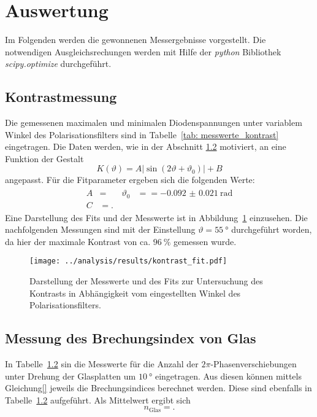 \section{Auswertung}
Im Folgenden werden die gewonnenen Messergebnisse vorgestellt. Die notwendigen Ausgleichsrechungen werden 
mit Hilfe der \emph{python} Bibliothek \emph{scipy.optimize} durchgeführt.

\subsection{Kontrastmessung}
Die gemessenen maximalen und minimalen Diodenspannungen unter variablem Winkel des Polarisationsfilters sind in 
Tabelle~\ref{tab: messwerte_kontrast} eingetragen.
Die Daten werden, wie in der Abschnitt \ref{} motiviert, an eine Funktion der Gestalt
\begin{equation}
    K(\vartheta) = A \left|\sin \left(2 \vartheta + \vartheta_0 \right)\right| + B 
\end{equation}
angepasst. Für die Fitparameter ergeben sich die folgenden Werte:
\begin{align}
    \begin{aligned}
    A &=  \quad  & \vartheta_0 &=  = \SI{-0.092(21)}{\radian} \\ 
    C &= .
    \end{aligned}
\end{align}
Eine Darstellung des Fits und der Messwerte ist in Abbildung~\ref{fig: kontrast_fit} einzusehen.
Die nachfolgenden Messungen sind mit der Einstellung $\vartheta = \SI{55}{\degree}$ durchgeführt worden, da hier der maximale 
Kontrast von ca. $\SI{96}{\percent}$ gemessen wurde.  



\begin{figure}[h]
    \centering
    \texttt{[image: ../analysis/results/kontrast\_fit.pdf]}
    \label{fig: kontrast_fit}
    \caption{Darstellung der Messwerte und des Fits zur Untersuchung des Kontrasts in Abhängigkeit vom eingestellten Winkel des Polarisationsfilters.}
\end{figure}


\subsection{Messung des Brechungsindex von Glas}
In Tabelle~\ref{} sin die Messwerte für die Anzahl der $2\pi$-Phasenverschiebungen unter Drehung der Glasplatten um $\SI{10}{\degree}$
eingetragen. Aus diesen können mittels Gleichung\eqref{} jeweils die Brechungsindices berechnet werden. Diese sind ebenfalls in Tabelle~\ref{}  
aufgeführt. Als Mittelwert ergibt sich 
\begin{equation}
    n_{\text{Glas}} = .
\end{equation}

